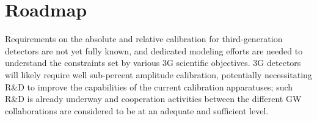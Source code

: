 \section{Roadmap}

Requirements on the absolute and relative calibration for third-generation detectors are not yet fully known, and dedicated modeling efforts are needed to understand the constraints set by various 3G scientific objectives. 3G detectors will likely require well sub-percent amplitude calibration, potentially necessitating R\&D to improve the capabilities of the current calibration apparatuses; such R\&D is already underway and cooperation activities between the different GW collaborations are considered to be at an adequate and sufficient level. 